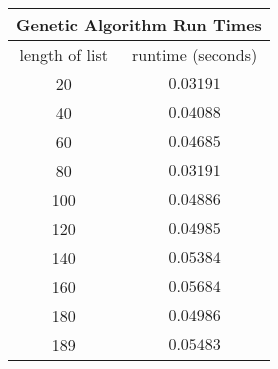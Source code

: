 \begin{tabular}{c|c}
    \hline
    \multicolumn{2}{|c|}{Genetic Algorithm Run Times} \\
    \hline
    length of list & runtime (seconds)                   \\
    \hline
    20             & $0.03191$                           \\
    40             & $0.04088$                           \\
    60             & $0.04685$                           \\
    80             & $0.03191$                           \\
    100            & $0.04886$                           \\
    120            & $0.04985$                           \\
    140            & $0.05384$                           \\
    160            & $0.05684$                           \\
    180            & $0.04986$                           \\
    189            & $0.05483$                           \\
    \hline
\end{tabular}